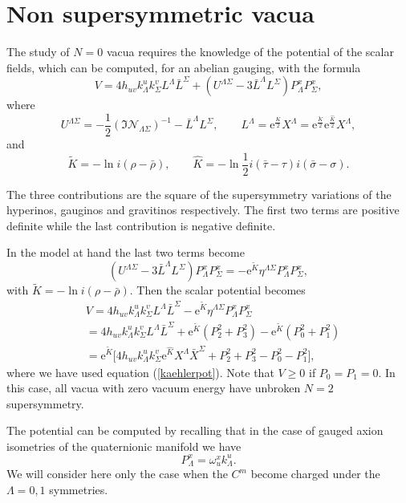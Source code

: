 \documentclass[a4paper,12pt]{article}
\begin{document}
\section{Non supersymmetric vacua}
The study of $N=0$ vacua requires the knowledge of the potential
of the scalar fields, which can be computed, for an abelian
gauging, with the formula \cite{abcdffm}
$$V=4h_{uv}k^u_\Lambda k^v_\Sigma L^\Lambda\bar L^\Sigma+
(U^{\Lambda\Sigma}-3\bar L^\Lambda
L^\Sigma)P_\Lambda^xP_\Sigma^x,$$ where
$$U^{\Lambda\Sigma}=-\frac 1 2
(\Im\mathcal{N}_{\Lambda\Sigma})^{-1}-\bar L^\Lambda L^\Sigma,
\qquad L^\Lambda=\mathrm{e}^{\frac K 2}X^\Lambda=
\mathrm{e}^{\frac{\tilde K} 2}\mathrm{e}^{\frac {\hat K}
2}X^\Lambda,$$ and
$$\tilde K=-\ln i(\rho-\bar\rho), \qquad \hat K=-\ln\frac 12i(\bar \tau-\tau)i(\bar \sigma-\sigma).$$



The three contributions are the square of the supersymmetry
variations of the hyperinos, gauginos and gravitinos respectively.
The first two terms are positive definite while the last
contribution is negative definite.

In the model at hand the last two terms become
$$(U^{\Lambda\Sigma}-3\bar L^\Lambda
L^\Sigma)P_\Lambda^xP_\Sigma^x=-\mathrm{e}^{\tilde K}
\eta^{\Lambda\Sigma}P_\Lambda^xP_\Sigma^x,$$ with $\tilde K=-\ln
i(\rho-\bar\rho)$. Then the scalar potential becomes
\begin{eqnarray*}&V=4h_{uv}k^u_\Lambda k^v_\Sigma L^\Lambda\bar
L^\Sigma-\mathrm{e}^{\tilde K}
\eta^{\Lambda\Sigma}P_\Lambda^xP_\Sigma^x \\
&=4h_{uv}k^u_\Lambda k^v_\Sigma L^\Lambda\bar
L^\Sigma+\mathrm{e}^{\tilde K}(P_2^2+P_3^2)-\mathrm{e}^{\tilde
K}(P_0^2+P_1^2)\\&= \mathrm{e}^{\tilde K}\bigl[4h_{uv}k^u_\Lambda
k^v_\Sigma \mathrm{e}^{\hat K}X^\Lambda\bar
X^\Sigma+P_2^2+P_3^2-P_0^2-P_1^2 \bigr],\end{eqnarray*} where we
have used equation (\ref{kaehlerpot}).  Note that $V\geq 0$ if
$P_0=P_1=0$. In this case, all vacua with zero vacuum energy have
unbroken $N=2$ supersymmetry.

The potential can be computed by recalling that in the case of
gauged axion isometries of the quaternionic manifold we have
$$P_\Lambda^x=\omega_u^xk^u_\Lambda.$$
We will consider here only the case when the $C^m$ become charged
under the $\Lambda=0,1$ symmetries.
\end{document}
